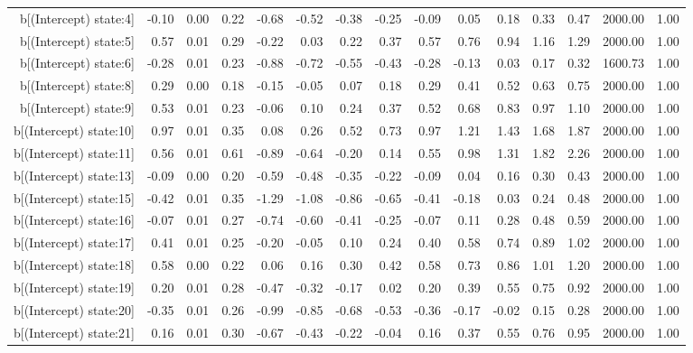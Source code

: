 \begin{table}[ht]
\begin{tabular}{rrrrrrrrrrrrrrr}
  b[(Intercept) state:4] & -0.10 & 0.00 & 0.22 & -0.68 & -0.52 & -0.38 & -0.25 & -0.09 & 0.05 & 0.18 & 0.33 & 0.47 & 2000.00 & 1.00 \\ 
  b[(Intercept) state:5] & 0.57 & 0.01 & 0.29 & -0.22 & 0.03 & 0.22 & 0.37 & 0.57 & 0.76 & 0.94 & 1.16 & 1.29 & 2000.00 & 1.00 \\ 
  b[(Intercept) state:6] & -0.28 & 0.01 & 0.23 & -0.88 & -0.72 & -0.55 & -0.43 & -0.28 & -0.13 & 0.03 & 0.17 & 0.32 & 1600.73 & 1.00 \\ 
  b[(Intercept) state:8] & 0.29 & 0.00 & 0.18 & -0.15 & -0.05 & 0.07 & 0.18 & 0.29 & 0.41 & 0.52 & 0.63 & 0.75 & 2000.00 & 1.00 \\ 
  b[(Intercept) state:9] & 0.53 & 0.01 & 0.23 & -0.06 & 0.10 & 0.24 & 0.37 & 0.52 & 0.68 & 0.83 & 0.97 & 1.10 & 2000.00 & 1.00 \\ 
  b[(Intercept) state:10] & 0.97 & 0.01 & 0.35 & 0.08 & 0.26 & 0.52 & 0.73 & 0.97 & 1.21 & 1.43 & 1.68 & 1.87 & 2000.00 & 1.00 \\ 
  b[(Intercept) state:11] & 0.56 & 0.01 & 0.61 & -0.89 & -0.64 & -0.20 & 0.14 & 0.55 & 0.98 & 1.31 & 1.82 & 2.26 & 2000.00 & 1.00 \\ 
  b[(Intercept) state:13] & -0.09 & 0.00 & 0.20 & -0.59 & -0.48 & -0.35 & -0.22 & -0.09 & 0.04 & 0.16 & 0.30 & 0.43 & 2000.00 & 1.00 \\ 
  b[(Intercept) state:15] & -0.42 & 0.01 & 0.35 & -1.29 & -1.08 & -0.86 & -0.65 & -0.41 & -0.18 & 0.03 & 0.24 & 0.48 & 2000.00 & 1.00 \\ 
  b[(Intercept) state:16] & -0.07 & 0.01 & 0.27 & -0.74 & -0.60 & -0.41 & -0.25 & -0.07 & 0.11 & 0.28 & 0.48 & 0.59 & 2000.00 & 1.00 \\ 
  b[(Intercept) state:17] & 0.41 & 0.01 & 0.25 & -0.20 & -0.05 & 0.10 & 0.24 & 0.40 & 0.58 & 0.74 & 0.89 & 1.02 & 2000.00 & 1.00 \\ 
  b[(Intercept) state:18] & 0.58 & 0.00 & 0.22 & 0.06 & 0.16 & 0.30 & 0.42 & 0.58 & 0.73 & 0.86 & 1.01 & 1.20 & 2000.00 & 1.00 \\ 
  b[(Intercept) state:19] & 0.20 & 0.01 & 0.28 & -0.47 & -0.32 & -0.17 & 0.02 & 0.20 & 0.39 & 0.55 & 0.75 & 0.92 & 2000.00 & 1.00 \\ 
  b[(Intercept) state:20] & -0.35 & 0.01 & 0.26 & -0.99 & -0.85 & -0.68 & -0.53 & -0.36 & -0.17 & -0.02 & 0.15 & 0.28 & 2000.00 & 1.00 \\ 
  b[(Intercept) state:21] & 0.16 & 0.01 & 0.30 & -0.67 & -0.43 & -0.22 & -0.04 & 0.16 & 0.37 & 0.55 & 0.76 & 0.95 & 2000.00 & 1.00 \\ 

\end{tabular}
\end{table}
